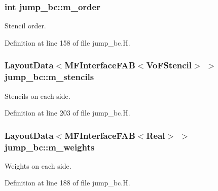 \subsubsection[{\texorpdfstring{m\+\_\+order}{m_order}}]{\setlength{\rightskip}{0pt plus 5cm}int jump\+\_\+bc\+::m\+\_\+order\hspace{0.3cm}{\ttfamily [protected]}}\hypertarget{classjump__bc_a18fd4f52c0e9a6a0f48ad900bab6fae5}{}\label{classjump__bc_a18fd4f52c0e9a6a0f48ad900bab6fae5}


Stencil order. 



Definition at line 158 of file jump\+\_\+bc.\+H.

\subsubsection[{\texorpdfstring{m\+\_\+stencils}{m_stencils}}]{\setlength{\rightskip}{0pt plus 5cm}Layout\+Data$<${\bf M\+F\+Interface\+F\+AB}$<$Vo\+F\+Stencil$>$ $>$ jump\+\_\+bc\+::m\+\_\+stencils\hspace{0.3cm}{\ttfamily [protected]}}\hypertarget{classjump__bc_ad219753bcb966f58bdd9ada2e2227d26}{}\label{classjump__bc_ad219753bcb966f58bdd9ada2e2227d26}


Stencils on each side. 



Definition at line 203 of file jump\+\_\+bc.\+H.

\subsubsection[{\texorpdfstring{m\+\_\+weights}{m_weights}}]{\setlength{\rightskip}{0pt plus 5cm}Layout\+Data$<${\bf M\+F\+Interface\+F\+AB}$<$Real$>$ $>$ jump\+\_\+bc\+::m\+\_\+weights\hspace{0.3cm}{\ttfamily [protected]}}\hypertarget{classjump__bc_aace8df163b8d2cc95be45906e2872e61}{}\label{classjump__bc_aace8df163b8d2cc95be45906e2872e61}


Weights on each side. 



Definition at line 188 of file jump\+\_\+bc.\+H.


